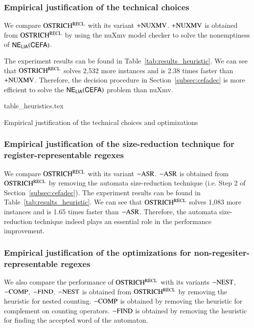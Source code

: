 \subsubsection{Empirical justification of the technical choices}
We compare $\rm OSTRICH^{RECL}$ with its variant  ${\rm +NUXMV}$. ${\rm +NUXMV}$  is obtained from $\rm OSTRICH^{RECL}$ by using the nuXmv model checker to solve the nonemptiness of ${\sf NE_{LIA}(CEFA)}$. 

The experiment results can be found in Table~\ref{tab:results_heuristic}. We can see that $\rm OSTRICH^{RECL}$ solves 2,532 more instances and is 2.38 times faster than ${\rm +NUXMV}$. Therefore, the decision procedure in Section~\ref{subsec:cefadec} is more efficient to solve the ${\sf NE_{LIA}(CEFA)}$ problem than nuXmv. 
\begin{table}
  {table_heuristics.tex}
  \caption{Empirical justification of the technical choices and optimizations}\label{tab:results_heuristic}
\end{table}

\subsubsection{Empirical justification of the size-reduction technique for register-representable regexes}
We compare $\rm OSTRICH^{RECL}$ with its variant ${\rm -ASR}$.  ${\rm -ASR}$ is obtained from $\rm OSTRICH^{RECL}$ by removing the automata size-reduction technique (i.e. Step 2 of Section~\ref{subsec:cefadec}). 
The experiment results can be found in Table~\ref{tab:results_heuristic}. We can see that $\rm OSTRICH^{RECL}$ solves 1,083 more instances and is 1.65 times faster than ${\rm -ASR}$. Therefore,  the automata size-reduction technique indeed plays an essential role in the performance improvement.

\subsubsection{Empirical justification of the optimizations for non-regesiter-representable regexes} 
We also compare the performance of $\rm OSTRICH^{RECL}$ with its variants ${\rm -NEST}$, ${\rm -COMP}$, ${\rm -FIND}$. ${\rm -NEST}$ is obtained from $\rm OSTRICH^{RECL}$ by removing the heuristic for nested counting. ${\rm -COMP}$ is obtained by removing the heuristic for complement on counting operators. ${\rm -FIND}$ is obtained by removing the heuristic for finding the accepted word of the automaton.

